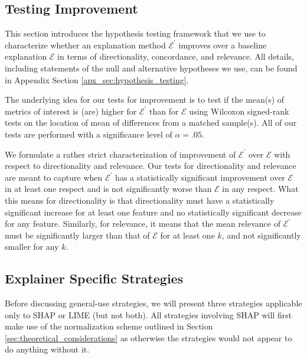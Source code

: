 \documentclass[mnsc,blindrev]{informs3}
\newcommand{\mE}{\mathcal{E}}
\begin{document}
    \subsection{Testing Improvement}
        \label{sec:improvement}
        This section introduces the hypothesis testing framework that we use to characterize whether an explanation method $\mE^\prime$ improves over a baseline explanation $\mE$ in terms of directionality, concordance, and relevance. All details, including statements of the null and alternative hypotheses we use, can be found in Appendix Section \ref{apx_sec:hypothesis_testing}.
        
        
        The underlying idea for our tests for improvement is to test if the mean(s) of metrics of interest  is (are) higher for $\mE^\prime$ than for $\mE$ using Wilcoxon signed-rank tests on the location of mean of differences from a matched sample(s).
        All of our tests are performed with a significance level of $\alpha=.05$. 
        
        We formulate a rather strict characterization of improvement of $\mE^\prime$ over $\mE$ with respect to directionality and relevance. Our tests for directionality and relevance are meant to capture when $\mE^\prime$ has a statistically significant improvement over $\mE$ in at least one respect and is not significantly worse than $\mE$ in any respect. What this means for directionality is that directionality must have a statistically significant increase for at least one feature and no statistically significant decrease for any feature. Similarly, for relevance, it means that the mean relevance of $\mE^\prime$ must be significantly larger than that of $\mE$ for at least one $k$, and not significantly smaller for any $k$. 
        
        
     


    \subsection{Explainer Specific Strategies}
        Before discussing general-use strategies, we will present three strategies applicable only to SHAP or LIME (but not both). All strategies involving SHAP will first make use of the normalization scheme outlined in Section \ref{sec:theoretical_considerations} as otherwise the strategies would not appear to do anything without it.
\end{document}

